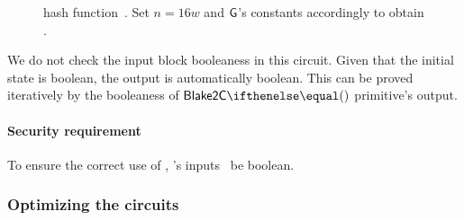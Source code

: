 \begin{figure*}[h!]
  \centering
  \caption{ hash function~\cite[Section 3.3]{blakecompietf}. Set $n=16w$ and $\mathsf{G}$'s constants accordingly to obtain .}\label{implementation:alg:blake2s_hash}
\end{figure*}

We do not check the input block booleaness in this circuit. Given that the initial state is boolean, the output is automatically boolean. This can be proved iteratively by the booleaness of $\blake{2C}{}$ primitive's output.

\paragraph*{Security requirement}

To ensure the correct use of , 's inputs \MUST~be boolean.

\subsubsection{Optimizing the circuits}\label{implementation:efficiency:blake:optimization}

